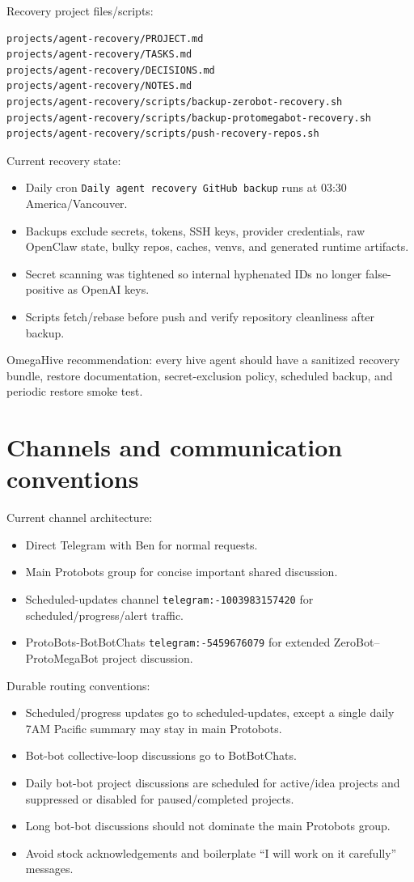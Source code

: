 \documentclass[11pt]{article}
\begin{document}
Recovery project files/scripts:
\begin{verbatim}
projects/agent-recovery/PROJECT.md
projects/agent-recovery/TASKS.md
projects/agent-recovery/DECISIONS.md
projects/agent-recovery/NOTES.md
projects/agent-recovery/scripts/backup-zerobot-recovery.sh
projects/agent-recovery/scripts/backup-protomegabot-recovery.sh
projects/agent-recovery/scripts/push-recovery-repos.sh
\end{verbatim}

Current recovery state:
\begin{itemize}
  \item Daily cron \texttt{Daily agent recovery GitHub backup} runs at 03:30 America/Vancouver.
  \item Backups exclude secrets, tokens, SSH keys, provider credentials, raw OpenClaw state, bulky repos, caches, venvs, and generated runtime artifacts.
  \item Secret scanning was tightened so internal hyphenated IDs no longer false-positive as OpenAI keys.
  \item Scripts fetch/rebase before push and verify repository cleanliness after backup.
\end{itemize}

OmegaHive recommendation: every hive agent should have a sanitized recovery bundle, restore documentation, secret-exclusion policy, scheduled backup, and periodic restore smoke test.

\section{Channels and communication conventions}

Current channel architecture:
\begin{itemize}
  \item Direct Telegram with Ben for normal requests.
  \item Main Protobots group for concise important shared discussion.
  \item Scheduled-updates channel \texttt{telegram:-1003983157420} for scheduled/progress/alert traffic.
  \item ProtoBots-BotBotChats \texttt{telegram:-5459676079} for extended ZeroBot--ProtoMegaBot project discussion.
\end{itemize}

Durable routing conventions:
\begin{itemize}
  \item Scheduled/progress updates go to scheduled-updates, except a single daily 7AM Pacific summary may stay in main Protobots.
  \item Bot-bot collective-loop discussions go to BotBotChats.
  \item Daily bot-bot project discussions are scheduled for active/idea projects and suppressed or disabled for paused/completed projects.
  \item Long bot-bot discussions should not dominate the main Protobots group.
  \item Avoid stock acknowledgements and boilerplate ``I will work on it carefully'' messages.
\end{itemize}
\end{document}
